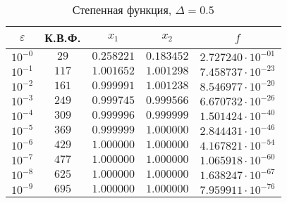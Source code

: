 \documentclass[a4paper,12pt,notitlepage,pdftex,headsepline]{scrartcl}
\begin{document}
        \begin{table}[ht]
          \centering
          \caption{Степенная функция, $\Delta = 0.5$}
          \begin{tabular}{|c|c|c|c|c|}
            \hline
            $\varepsilon$ & К.В.Ф. & $x_1$ & $x_2$ & $f$\\
            \hline
            $10^{-0}$ & $29$ & $0.258221$ & $0.183452$ & $2.727240\cdot 10^{-01}$\\
            $10^{-1}$ & $117$ & $1.001652$ & $1.001298$ & $7.458737\cdot 10^{-23}$\\
            $10^{-2}$ & $161$ & $0.999991$ & $1.001238$ & $8.546977\cdot 10^{-20}$\\
            $10^{-3}$ & $249$ & $0.999745$ & $0.999566$ & $6.670732\cdot 10^{-26}$\\
            $10^{-4}$ & $309$ & $0.999996$ & $0.999999$ & $1.501424\cdot 10^{-40}$\\
            $10^{-5}$ & $369$ & $0.999999$ & $1.000000$ & $2.844431\cdot 10^{-46}$\\
            $10^{-6}$ & $429$ & $1.000000$ & $1.000000$ & $4.167821\cdot 10^{-54}$\\
            $10^{-7}$ & $477$ & $1.000000$ & $1.000000$ & $1.065918\cdot 10^{-60}$\\
            $10^{-8}$ & $625$ & $1.000000$ & $1.000000$ & $1.638247\cdot 10^{-67}$\\
            $10^{-9}$ & $695$ & $1.000000$ & $1.000000$ & $7.959911\cdot 10^{-76}$\\
            \hline
          \end{tabular}
        \end{table}
\end{document}

